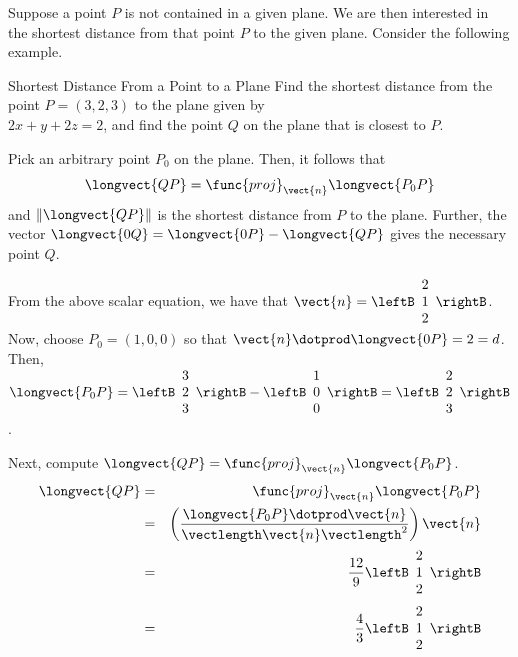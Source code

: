 Suppose a point $P$ is not contained in a given plane. We are then interested in the shortest distance from that point $P$ to the given plane. Consider the following example. 

\begin{example}{Shortest Distance From a Point to a Plane}\label{exa:shortestdistanceplane}
Find the shortest distance from the point $P = (3,2,3)$ to the plane given by \\ $ 2x + y + 2z = 2$, and find the point $Q$ on the plane that is closest to $P$. 
\end{example}

\begin{solution}
Pick an arbitrary point $P_0$ on the plane. Then, it follows that
\[
\longvect{QP} = \func{proj}_{\vect{n}}\longvect{P_0P}
\]
and $\| \longvect{QP} \|$ is the shortest distance from $P$ to the plane. Further, the vector $\longvect{0Q} = \longvect{0P} - \longvect{QP}$ gives the necessary point $Q$. 

From the above scalar equation, we have that $\vect{n} = 
\leftB
\begin{array}{c}
2 \\
1 \\
2 
\end{array}
\rightB$. Now, choose $P_0 = (1, 0, 0)$ so that $\vect{n} \dotprod \longvect{0P} = 2 = d$. 
Then, $\longvect{P_0P} = \leftB
\begin{array}{c}
3 \\
2 \\
3
\end{array}
\rightB
- 
\leftB
\begin{array}{c}
1 \\
0 \\
0
\end{array}
\rightB
=
\leftB
\begin{array}{c}
2 \\
2 \\
3
\end{array}
\rightB$. 

Next, compute $\longvect{QP} = \func{proj}_{\vect{n}}\longvect{P_0P}$. 
\begin{eqnarray*}
\longvect{QP} &=& \func{proj}_{\vect{n}}\longvect{P_0P} \\
&=& \left( \frac{ \longvect{P_0P} \dotprod \vect{n}}{\vectlength \vect{n} \vectlength ^2}\right)\vect{n} \\
&=& \frac{12}{9} \leftB
\begin{array}{r}
2 \\
1 \\
2
\end{array}
\rightB \\
&=& \frac{4}{3} \leftB
\begin{array}{r}
2 \\
1 \\
2
\end{array}
\rightB 
\end{eqnarray*}


\end{solution}
